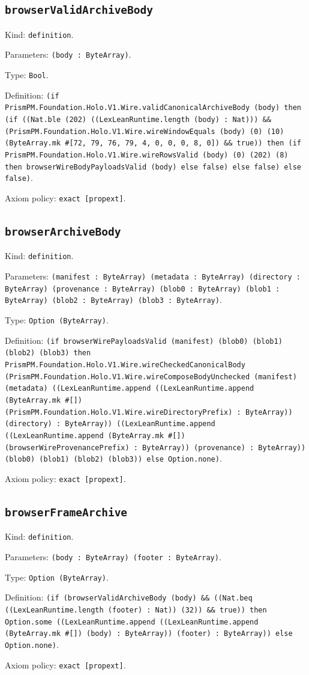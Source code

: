 \documentclass[11pt]{article}
\begin{document}
\subsection*{\texttt{browserValidArchiveBody}}
\noindent Kind: \texttt{definition}.\par
\noindent Parameters: \texttt{(body : ByteArray)}.\par
\noindent Type: \texttt{Bool}.\par
\noindent Definition: \texttt{(if PrismPM.Foundation.Holo.V1.Wire.validCanonicalArchiveBody (body) then (if ((Nat.ble (202) ((LexLeanRuntime.length (body) : Nat))) \&\& (PrismPM.Foundation.Holo.V1.Wire.wireWindowEquals (body) (0) (10) (ByteArray.mk \#[72, 79, 76, 79, 4, 0, 0, 0, 8, 0]) \&\& true)) then (if PrismPM.Foundation.Holo.V1.Wire.wireRowsValid (body) (0) (202) (8) then browserWireBodyPayloadsValid (body) else false) else false) else false)}.\par
\noindent Axiom policy: \texttt{exact [propext]}.\par
\subsection*{\texttt{browserArchiveBody}}
\noindent Kind: \texttt{definition}.\par
\noindent Parameters: \texttt{(manifest : ByteArray) (metadata : ByteArray) (directory : ByteArray) (provenance : ByteArray) (blob0 : ByteArray) (blob1 : ByteArray) (blob2 : ByteArray) (blob3 : ByteArray)}.\par
\noindent Type: \texttt{Option (ByteArray)}.\par
\noindent Definition: \texttt{(if browserWirePayloadsValid (manifest) (blob0) (blob1) (blob2) (blob3) then PrismPM.Foundation.Holo.V1.Wire.wireCheckedCanonicalBody (PrismPM.Foundation.Holo.V1.Wire.wireComposeBodyUnchecked (manifest) (metadata) ((LexLeanRuntime.append ((LexLeanRuntime.append (ByteArray.mk \#[]) (PrismPM.Foundation.Holo.V1.Wire.wireDirectoryPrefix) : ByteArray)) (directory) : ByteArray)) ((LexLeanRuntime.append ((LexLeanRuntime.append (ByteArray.mk \#[]) (browserWireProvenancePrefix) : ByteArray)) (provenance) : ByteArray)) (blob0) (blob1) (blob2) (blob3)) else Option.none)}.\par
\noindent Axiom policy: \texttt{exact [propext]}.\par
\subsection*{\texttt{browserFrameArchive}}
\noindent Kind: \texttt{definition}.\par
\noindent Parameters: \texttt{(body : ByteArray) (footer : ByteArray)}.\par
\noindent Type: \texttt{Option (ByteArray)}.\par
\noindent Definition: \texttt{(if (browserValidArchiveBody (body) \&\& ((Nat.beq ((LexLeanRuntime.length (footer) : Nat)) (32)) \&\& true)) then Option.some ((LexLeanRuntime.append ((LexLeanRuntime.append (ByteArray.mk \#[]) (body) : ByteArray)) (footer) : ByteArray)) else Option.none)}.\par
\noindent Axiom policy: \texttt{exact [propext]}.\par
\end{document}
